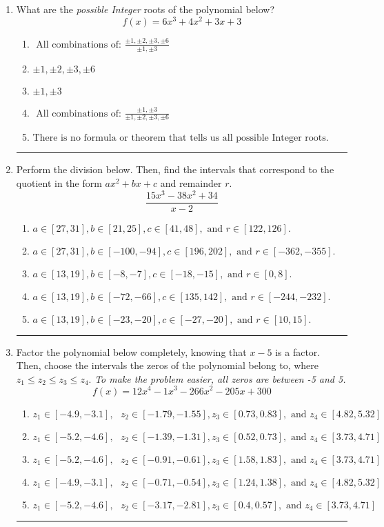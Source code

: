 \documentclass[14pt]{extbook}
\newcommand{\litem}[1]{\item#1\hspace*{-1cm}\rule{\textwidth}{0.4pt}}
\begin{document}
\begin{enumerate}
{\begin{enumerate}[label=\Alph*.]
\end{enumerate} }
\litem{
What are the \textit{possible Integer} roots of the polynomial below?\[ f(x) = 6x^{3} +4 x^{2} +3 x + 3 \]\begin{enumerate}[label=\Alph*.]
\item \( \text{ All combinations of: }\frac{\pm 1,\pm 2,\pm 3,\pm 6}{\pm 1,\pm 3} \)
\item \( \pm 1,\pm 2,\pm 3,\pm 6 \)
\item \( \pm 1,\pm 3 \)
\item \( \text{ All combinations of: }\frac{\pm 1,\pm 3}{\pm 1,\pm 2,\pm 3,\pm 6} \)
\item \( \text{There is no formula or theorem that tells us all possible Integer roots.} \)

\end{enumerate} }
\litem{
Perform the division below. Then, find the intervals that correspond to the quotient in the form $ax^2+bx+c$ and remainder $r$.\[ \frac{15x^{3} -38 x^{2} + 34}{x -2} \]\begin{enumerate}[label=\Alph*.]
\item \( a \in [27, 31], b \in [21, 25], c \in [41, 48], \text{ and } r \in [122, 126]. \)
\item \( a \in [27, 31], b \in [-100, -94], c \in [196, 202], \text{ and } r \in [-362, -355]. \)
\item \( a \in [13, 19], b \in [-8, -7], c \in [-18, -15], \text{ and } r \in [0, 8]. \)
\item \( a \in [13, 19], b \in [-72, -66], c \in [135, 142], \text{ and } r \in [-244, -232]. \)
\item \( a \in [13, 19], b \in [-23, -20], c \in [-27, -20], \text{ and } r \in [10, 15]. \)

\end{enumerate} }
\litem{
Factor the polynomial below completely, knowing that $x -5$ is a factor. Then, choose the intervals the zeros of the polynomial belong to, where $z_1 \leq z_2 \leq z_3 \leq z_4$. \textit{To make the problem easier, all zeros are between -5 and 5.}\[ f(x) = 12x^{4} -1 x^{3} -266 x^{2} -205 x + 300 \]\begin{enumerate}[label=\Alph*.]
\item \( z_1 \in [-4.9, -3.1], \text{   }  z_2 \in [-1.79, -1.55], z_3 \in [0.73, 0.83], \text{   and   } z_4 \in [4.82, 5.32] \)
\item \( z_1 \in [-5.2, -4.6], \text{   }  z_2 \in [-1.39, -1.31], z_3 \in [0.52, 0.73], \text{   and   } z_4 \in [3.73, 4.71] \)
\item \( z_1 \in [-5.2, -4.6], \text{   }  z_2 \in [-0.91, -0.61], z_3 \in [1.58, 1.83], \text{   and   } z_4 \in [3.73, 4.71] \)
\item \( z_1 \in [-4.9, -3.1], \text{   }  z_2 \in [-0.71, -0.54], z_3 \in [1.24, 1.38], \text{   and   } z_4 \in [4.82, 5.32] \)
\item \( z_1 \in [-5.2, -4.6], \text{   }  z_2 \in [-3.17, -2.81], z_3 \in [0.4, 0.57], \text{   and   } z_4 \in [3.73, 4.71] \)


\end{enumerate}}
\end{enumerate}
\end{document}
